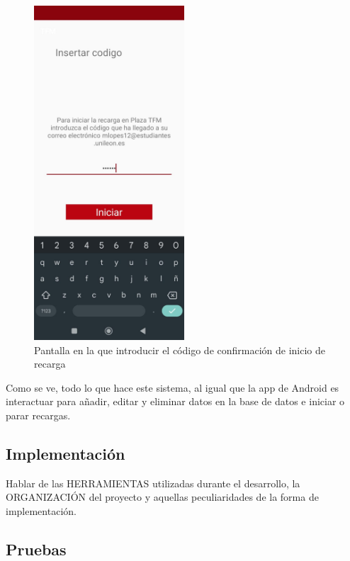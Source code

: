 \documentclass[12pt,a4paper,onecolumn,oneside]{report}
\begin{document}
\begin{figure}[H] 
\centering
  \includegraphics[width=0.5\textwidth]{figuras/design8.png}
  \caption[Pantalla en la que introducir el código de confirmación de inicio de recarga]{Pantalla en la que introducir el código de confirmación de inicio de recarga\\
  }
  \label{fig:design8}
\end{figure}

Como se ve, todo lo que hace este sistema, al igual que la app de Android es interactuar para añadir, editar y eliminar datos en la base de datos e iniciar o parar recargas.


\subsection{Implementación}

Hablar de las HERRAMIENTAS utilizadas durante el desarrollo, la ORGANIZACIÓN del proyecto y aquellas peculiaridades de la forma de implementación.

\subsection{Pruebas}
\end{document}
